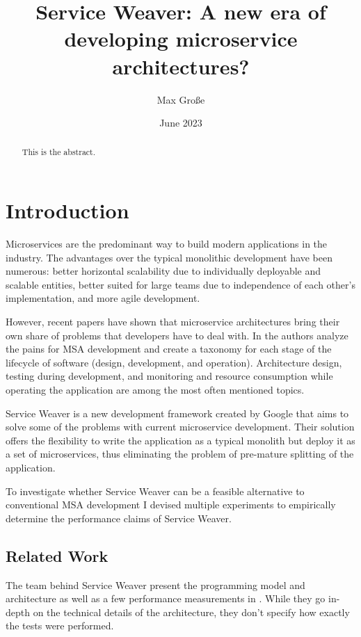 \documentclass[sigconf,review,9pt]{acmart}
\title{Service Weaver: A new era of developing microservice architectures?}
\author{Max Große}
\date{June 2023}
\begin{document}
\begin{abstract}
	This is the abstract.
\end{abstract}

\maketitle

\section{Introduction}
Microservices are the predominant way to build modern applications in the industry. \cite{wang_ms_current_situation}
The advantages over the typical monolithic development have been numerous:
better horizontal scalability due to individually deployable and scalable entities,
better suited for large teams due to independence of each other's implementation,
and more agile development.

However, recent papers have shown that microservice architectures bring their own share
of problems that developers have to deal with.
In \cite{soldani_pains_gains} the authors analyze the pains for MSA development
and create a taxonomy for each stage of the lifecycle of software (design, development, and operation).
Architecture design, testing during development, and monitoring and resource consumption
while operating the application are among the most often mentioned topics.

Service Weaver is a new development framework created by Google that aims to solve some of
the problems with current microservice development.
Their solution offers the flexibility to write the application as a typical monolith
but deploy it as a set of microservices, thus eliminating the problem of pre-mature
splitting of the application.

To investigate whether Service Weaver can be a feasible alternative to conventional
MSA development I devised multiple experiments to empirically determine the performance
claims of Service Weaver.

\subsection{Related Work}
The team behind Service Weaver present the programming model and architecture
as well as a few performance measurements in \cite{service_weaver_paper}.
While they go in-depth on the technical details of the architecture, they don't
specify how exactly the tests were performed.
\end{document}
